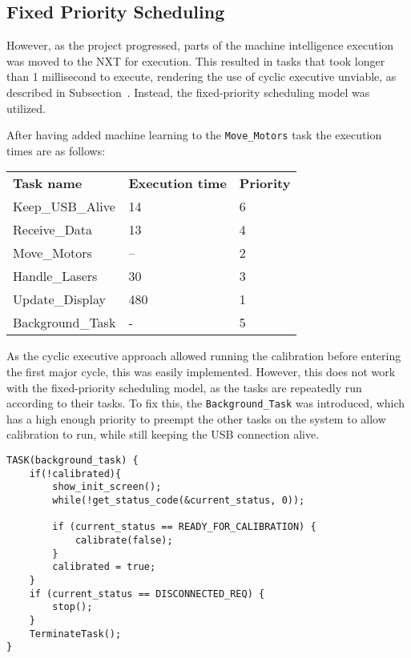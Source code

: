 \subsection{Fixed Priority Scheduling}
However, as the project progressed, parts of the machine intelligence execution was moved to the NXT for execution.
This resulted in tasks that took longer than 1 millisecond to execute, rendering the use of cyclic executive unviable, as described in Subsection~\cite{Design:Scheduling}. 
Instead, the fixed-priority scheduling model was utilized. 

After having added machine learning to the \texttt{Move\_Motors} task the execution times are as follows:

\begin{table}[tbp]
\begin{tabular}{lll}
\textbf{Task name}  & \textbf{Execution time} 	& \textbf{Priority}\\
Keep\_USB\_Alive    & 14                        & 6    \\
Receive\_Data       & 13                        & 4   \\
Move\_Motors        & --                        & 2   \\
Handle\_Lasers      & 30                        & 3   \\
Update\_Display     & 480                       & 1   \\                     
Background\_Task    & -                        	& 5  \\                     
\end{tabular}
\end{table}\label{table:executionTimes}

As the cyclic executive approach allowed running the calibration before entering the first major cycle, this was easily implemented.
However, this does not work with the fixed-priority scheduling model, as the tasks are repeatedly run according to their tasks.
To fix this, the \texttt{Background\_Task} was introduced, which has a high enough priority to preempt the other tasks on the system to allow calibration to run, while still keeping the USB connection alive.

\begin{lstlisting}[language=CSharp,label={lst:backgroundTask},caption={Background task}]
TASK(background_task) {
    if(!calibrated){
        show_init_screen();
        while(!get_status_code(&current_status, 0));

        if (current_status == READY_FOR_CALIBRATION) {
            calibrate(false);
        }
        calibrated = true;
    }
    if (current_status == DISCONNECTED_REQ) {
        stop();
    }
    TerminateTask();
}
\end{lstlisting}

